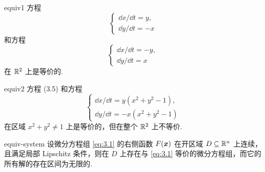 \begin{example}{}{equiv1}
方程
\[
\begin{cases}
\dd x/\dd t = y, \\
\dd y/\dd t = -x
\end{cases}
\]
和方程
\[
\begin{cases}
\dd x/\dd t = -y, \\
\dd y/\dd t = x
\end{cases} \tag{3.5}\label{eq:3.5}
\]
在 $\mathbb{R}^2$ 上是等价的.
\end{example}

\begin{example}{}{equiv2}
方程 (3.5) 和方程
\[
\begin{cases}
\dd x/\dd t = y(x^2 + y^2 - 1), \\
\dd y/\dd t = -x(x^2 + y^2 - 1)
\end{cases} \tag{3.6}\label{eq:3.6}
\]
在区域 $x^2 + y^2 \neq 1$ 上是等价的，但在整个 $\mathbb{R}^2$ 上不等价.
\end{example}

\begin{theorem}{}{equiv-system}
设微分方程组 \eqref{eq:3.1} 的右侧函数 $F(\boldsymbol{x})$ 在开区域 $D \subseteq \mathbb{R}^n$ 上连续，且满足局部 Lipschitz 条件，则在 $D$ 上存在与 \eqref{eq:3.1} 等价的微分方程组，而它的所有解的存在区间为无限的.
\end{theorem}

